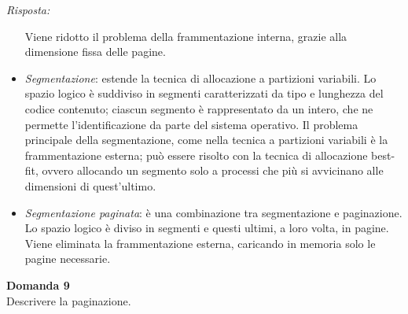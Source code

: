 \documentclass{article}
\newenvironment{problem}[2][Domanda]
    { \begin{mdframed}[backgroundcolor=gray!20] \textbf{#1 #2} \\}
    {  \end{mdframed}}
\newenvironment{solution}
    {\textit{Risposta:}}
    {}
\begin{document}
\begin{solution}
\begin{itemize}
    \newline
    Viene ridotto il problema della frammentazione interna, grazie alla dimensione fissa delle pagine.
    \item \emph{Segmentazione}: estende la tecnica di allocazione a partizioni variabili.
    \newline
    Lo spazio logico è suddiviso in segmenti caratterizzati da tipo e lunghezza del codice contenuto; ciascun segmento è rappresentato da un intero, che ne permette l'identificazione da parte del sistema operativo. 
    \newline
    Il problema principale della segmentazione, come nella tecnica a partizioni variabili è la frammentazione esterna; può essere risolto con la tecnica di allocazione best-fit, ovvero allocando un segmento solo a processi che più si avvicinano alle dimensioni di quest'ultimo.
    \item \emph{Segmentazione paginata}: è una combinazione tra segmentazione e paginazione. Lo spazio logico è diviso in segmenti e questi ultimi, a loro volta, in pagine.
    \newline Viene eliminata la frammentazione esterna, caricando in memoria solo le pagine necessarie.
\end{itemize}
\end{solution}
\begin{problem}{9}
Descrivere la paginazione.
\end{problem}
\end{document}
